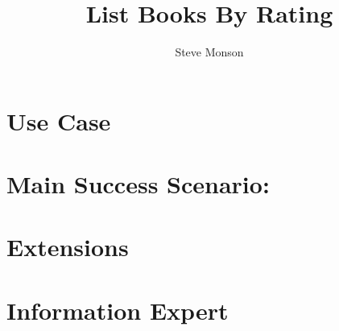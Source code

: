 \documentclass{article}
\title{List Books By Rating}
\author{Steve Monson}
\begin{document}
\maketitle

\section*{Use Case}

\section*{Main Success Scenario:}

\section*{Extensions}

\section*{Information Expert}
\end{document}

